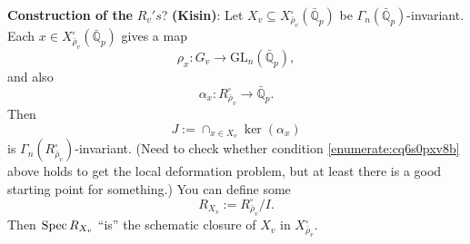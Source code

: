 \documentclass[reqno]{amsart} 
\begin{document}
\textbf{Construction of the} $R_v's$? \textbf{(Kisin)}: Let $X_v \subseteq X_{\bar{\rho}_v}^{\square}(\bar{\mathbb{Q}}_p)$ be $\Gamma_n(\bar{\mathbb{Q}}_p)$-invariant.  Each $x \in X_{\bar{\rho}_v}^{\square}(\bar{\mathbb{Q}}_p)$ gives a map
\begin{equation*}
  \rho_x : G_v \rightarrow \mathrm{GL}_n(\bar{\mathbb{Q}}_p),
\end{equation*}
and also
\begin{equation*}
  \alpha_x : R_{\bar{\rho}_v}^{\square} \rightarrow \bar{\mathbb{Q}}_p.
\end{equation*}
Then
\begin{equation*}
  J := \cap_{x \in X_v} \ker(\alpha_x)
\end{equation*}
is $\Gamma_n(R_{\bar{\rho}_v}^{\square})$-invariant.  (Need to check whether condition \eqref{enumerate:cq6s0pxv8b} above holds to get the local deformation problem, but at least there is a good starting point for something.)  You can define some
\begin{equation*}
  R_{X_v} := R_{\bar{\rho}_v}^{\square} / I.
\end{equation*}
Then $\operatorname{Spec} R_{X_v}$ ``is'' the schematic closure of $X_v$ in $X_{\bar{\rho}_v}^{\square}$.
\end{document}
